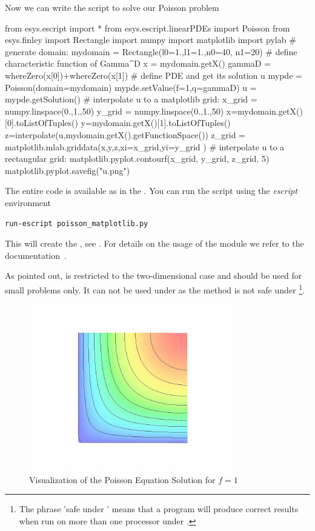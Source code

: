 Now we can write the script to solve our Poisson problem
\begin{python}
  from esys.escript import *
  from esys.escript.linearPDEs import Poisson
  from esys.finley import Rectangle
  import numpy
  import matplotlib
  import pylab
  # generate domain:
  mydomain = Rectangle(l0=1.,l1=1.,n0=40, n1=20)
  # define characteristic function of Gamma^D
  x = mydomain.getX()
  gammaD = whereZero(x[0])+whereZero(x[1])
  # define PDE and get its solution u
  mypde = Poisson(domain=mydomain)
  mypde.setValue(f=1,q=gammaD)
  u = mypde.getSolution()
  # interpolate u to a matplotlib grid:
  x_grid = numpy.linspace(0.,1.,50)
  y_grid = numpy.linspace(0.,1.,50)
  x=mydomain.getX()[0].toListOfTuples()
  y=mydomain.getX()[1].toListOfTuples()
  z=interpolate(u,mydomain.getX().getFunctionSpace())
  z_grid = matplotlib.mlab.griddata(x,y,z,xi=x_grid,yi=y_grid )
  # interpolate u to a rectangular grid:
  matplotlib.pyplot.contourf(x_grid, y_grid, z_grid, 5)
  matplotlib.pyplot.savefig("u.png")
\end{python}
The entire code is available as  in the \ExampleDirectory.
You can run the script using the {\it escript} environment
\begin{verbatim}
run-escript poisson_matplotlib.py
\end{verbatim}
This will create the , see .
For details on the usage of the \MATPLOTLIB module we refer to the documentation~\cite{matplotlib}.

As pointed out, \MATPLOTLIB is restricted to the two-dimensional case and
should be used for small problems only.
It can not be used under \MPI as the  method is not
safe under \MPI\footnote{The phrase 'safe under \MPI' means that a program
will produce correct results when run on more than one processor under \MPI.}.

\begin{figure}
\centerline{\includegraphics[width=\figwidth]{figures/FirstStepResult}}
\caption{Visualization of the Poisson Equation Solution for $f=1$}
\label{fig:FirstSteps.3}
\end{figure}

